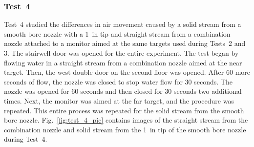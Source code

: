 \documentclass[12pt,oneside]{book}
\begin{document}
\subsubsection{Test~4}
Test~4 studied the differences in air movement caused by a solid stream from a smooth bore nozzle with a 1~in tip and straight stream from a combination nozzle attached to a monitor aimed at the same targets used during Tests~2 and 3. The stairwell door was opened for the entire experiment. The test began by flowing water in a straight stream from a combination nozzle aimed at the near target. Then, the west double door on the second floor was opened. After 60 more seconds of flow, the nozzle was closed to stop water flow for 30 seconds. The nozzle was opened for 60 seconds and then closed for 30 seconds two additional times. Next, the monitor was aimed at the far target, and the procedure was repeated. This entire process was repeated for the solid stream from the smooth bore nozzle. Fig.~\ref{fig:test_4_pic} contains images of the straight stream from the combination nozzle and solid stream from the 1~in tip of the smooth bore nozzle during Test~4.
\end{document}
